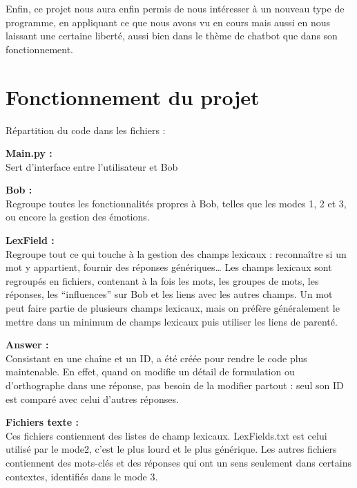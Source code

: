 \documentclass[paper=a4, 12pt]{report}
\begin{document}
\vspace{0.5cm}

Enfin, ce projet nous aura enfin permis de nous intéresser à un nouveau type de programme, en appliquant ce que nous avons vu en cours mais aussi en nous laissant une certaine liberté, aussi bien dans le thème de chatbot que dans son fonctionnement.


\section{Fonctionnement du projet}
\vspace{0.5cm}
Répartition du code dans les fichiers :

\vspace{0.5cm}

\textbf{Main.py :} \\
Sert d’interface entre l’utilisateur et Bob

\vspace{0.5cm}

\textbf{Bob :} \\
Regroupe toutes les fonctionnalités propres à Bob, telles que les modes 1, 2 et 3, ou encore la gestion des émotions.

\vspace{0.5cm}

\textbf{LexField :} \\
Regroupe tout ce qui touche à la gestion des champs lexicaux : reconnaître si un mot y appartient, fournir des réponses génériques… Les champs lexicaux sont regroupés en fichiers, contenant à la fois les mots, les groupes de mots, les réponses, les “influences” sur Bob et les liens avec les autres champs. Un mot peut faire partie de plusieurs champs lexicaux, mais on préfère généralement le mettre dans un minimum de champs lexicaux puis utiliser les liens de parenté. 

\vspace{0.5cm}

\textbf{Answer :} \\
Consistant en une chaîne et un ID, a été créée pour rendre le code plus maintenable. En effet, quand on modifie un détail de formulation ou d’orthographe dans une réponse, pas besoin de la modifier partout : seul son ID est comparé avec celui d’autres réponses.


\vspace{0.5cm}

\textbf{Fichiers texte :} \\
Ces fichiers contiennent des listes de champ lexicaux. LexFields.txt est celui utilisé par le mode2, c’est le plus lourd et le plus générique. Les autres fichiers contiennent des mots-clés et des réponses qui ont un sens seulement dans certains contextes, identifiés dans le mode 3.
\end{document}
